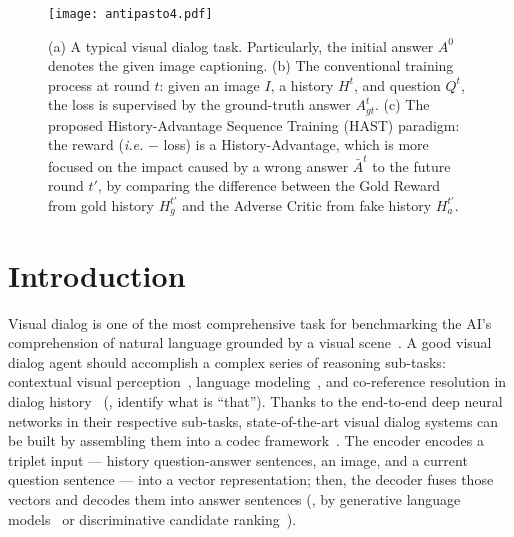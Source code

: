 \documentclass[10pt,twocolumn,letterpaper]{article}
\begin{document}
\begin{figure}[t]
\begin{center}
\texttt{[image: antipasto4.pdf]}
\end{center}
    \caption{(a) A typical visual dialog task. Particularly, the initial answer $A^0$ denotes the given image captioning. (b) The conventional training process at round $t$: given an image $I$, a history $H^{t}$, and question $Q^t$, the loss is supervised by the ground-truth answer {\color{green}$A^t_{gt}$}. (c) The proposed History-Advantage Sequence Training (HAST) paradigm: the reward (\emph{i.e.} $-$ loss) is a History-Advantage, which is more focused on the impact caused by a wrong answer {\color{red}$\bar{A}^t$} to the future round $t'$, by comparing the difference between the Gold Reward from gold history $H^{t'}_g$ and the Adverse Critic from fake history $H^{t'}_a$.
    }
  \label{fig:1}
\end{figure}


\section{Introduction}
Visual dialog is one of the most comprehensive task for benchmarking the AI's comprehension of natural language grounded by a visual scene~\cite{das2017visual}. A good visual dialog agent should accomplish a complex series of reasoning sub-tasks: contextual visual perception~\cite{wu2017you,lu2017best,das2017human,seo2017visual,kottur2018visual,yang2016stacked,shih2016look}, language modeling~\cite{hochreiter1997long,chung2014empirical}, and co-reference resolution in dialog history~\cite{seo2017visual,kottur2018visual} (\eg, identify what is ``that''). Thanks to the end-to-end deep neural networks in their respective sub-tasks, state-of-the-art visual dialog systems can be built by assembling them into a codec framework~\cite{wu2017you,das2017visual,lu2017best}. The encoder encodes a triplet input --- history question-answer sentences, an image, and a current question sentence --- into a vector representation; then, the decoder fuses those vectors and decodes them into answer sentences (\eg, by generative language models~\cite{das2017visual,lu2017best,wu2017you} or discriminative candidate ranking~\cite{jain2018two,kottur2018visual}).
\end{document}
